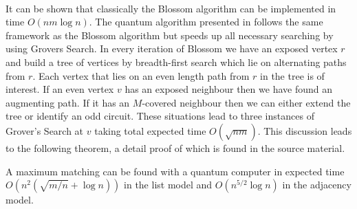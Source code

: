 \paragraph{}
It can be shown that classically the Blossom algorithm can be implemented in time $O(nm\log n)$. The quantum algorithm presented in \cite{ambainis2006quantum} follows the same framework as the Blossom algorithm but speeds up all necessary searching by using Grovers Search. In every iteration of Blossom we have an exposed vertex $r$ and build a tree of vertices by breadth-first search which lie on alternating paths from $r$. Each vertex that lies on an even length path from $r$ in the tree is of interest. If an even vertex $v$ has an exposed neighbour then we have found an augmenting path. If it has an $M$-covered neighbour then we can either extend the tree or identify an odd circuit. These situations lead to three instances of Grover's Search at $v$ taking total expected time $O(\sqrt{nm})$.  This discussion leads to the following theorem, a detail proof of which is found in the source material.
\begin{theorem}
A maximum matching can be found with a quantum computer in expected time $O(n^2(\sqrt{m/n} + \log n))$ in the list model and $O(n^{5/2}\log n)$ in the adjacency model.
\end{theorem}                                                                                                                                                                                                                                                                                                                                                                                                                                                                                                                                                                                                                                                                                                                                                                                                                                                                                                                                                                                                                                                                                                                                                     